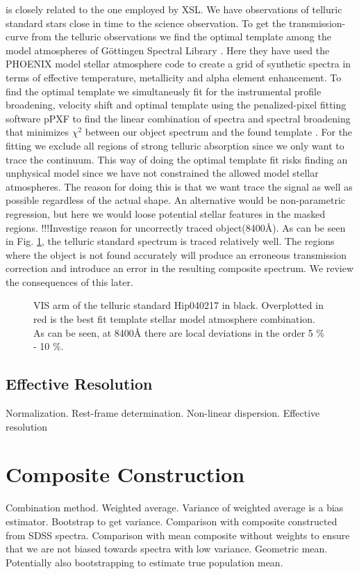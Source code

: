 \documentclass[iop]{emulateapj}
\begin{document}
is closely related to the one employed by XSL. We have observations of telluric standard stars close in time to the science observation. To get the transmission-curve from the telluric observations we find the optimal template among the model atmospheres of Göttingen Spectral Library \cite{Husser2013a}. Here they have used the PHOENIX model stellar atmosphere code to create a grid of synthetic spectra in terms of effective temperature, metallicity and alpha element enhancement. To find the optimal template we simultaneusly fit for the instrumental profile broadening, velocity shift and optimal template using the penalized-pixel fitting software pPXF \cite{Cappellari2014} to find the linear combination of spectra and spectral broadening that minimizes $\chi ^2$ between our object spectrum and the found template . For the fitting we exclude all regions of strong telluric absorption since we only want to trace the continuum. This way of doing the optimal template fit risks finding an unphysical model since we have not constrained the allowed model stellar atmospheres. The reason for doing this is that we want trace the signal as well as possible regardless of the actual shape. An alternative would be non-parametric regression, but here we would loose potential stellar features in the masked regions. !!!Investige reason for uncorrectly traced object(8400\r{A}). As can be seen in Fig. \ref{fig1}, the telluric standard spectrum is traced relatively well. The regions where the object is not found accurately will produce an erroneous transmission correction and introduce an error in the resulting composite spectrum. We review the consequences of this later. 

\begin{figure}
\caption{VIS arm of the telluric standard Hip040217 in black. Overplotted in red is the best fit template stellar model atmosphere combination. As can be seen, at 8400\r{A}  there are local deviations in the order 5 \% - 10 \%.\label{fig1}}
\end{figure}


\subsection{Effective Resolution}
Normalization. Rest-frame determination. Non-linear dispersion. Effective resolution

\section{Composite Construction}
Combination method. Weighted average. Variance of weighted average is a bias estimator. Bootstrap to get variance. Comparison with composite constructed from SDSS spectra. Comparison with mean composite without weights to ensure that we are not biased towards spectra with low variance. Geometric mean. Potentially also bootstrapping to estimate true population mean. 
\end{document}
